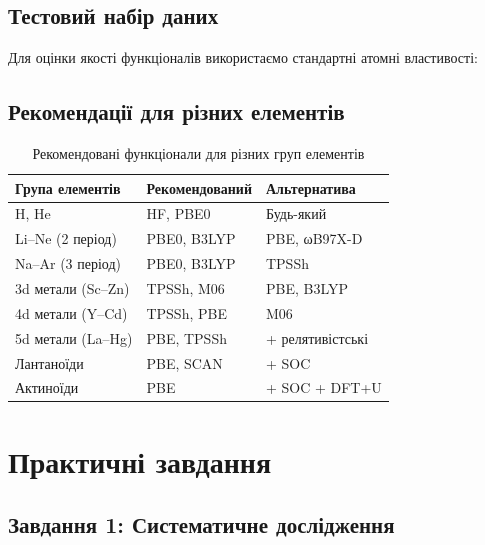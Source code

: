 \subsection{Тестовий набір даних}

Для оцінки якості функціоналів використаємо стандартні атомні властивості:


\subsection{Рекомендації для різних елементів}

\begin{table}[h]
\centering
\caption{Рекомендовані функціонали для різних груп елементів}
\label{tab:functional_by_element}
\small
\begin{tabular}{lll}
\hline
\textbf{Група елементів} & \textbf{Рекомендований} & \textbf{Альтернатива} \\
\hline
H, He & HF, PBE0 & Будь-який \\
Li--Ne (2 період) & PBE0, B3LYP & PBE, ωB97X-D \\
Na--Ar (3 період) & PBE0, B3LYP & TPSSh \\
3d метали (Sc--Zn) & TPSSh, M06 & PBE, B3LYP \\
4d метали (Y--Cd) & TPSSh, PBE & M06 \\
5d метали (La--Hg) & PBE, TPSSh & + релятивістські \\
Лантаноїди & PBE, SCAN & + SOC \\
Актиноїди & PBE & + SOC + DFT+U \\
\hline
\end{tabular}
\end{table}

\section{Практичні завдання}


\subsection{Завдання 1: Систематичне дослідження}

